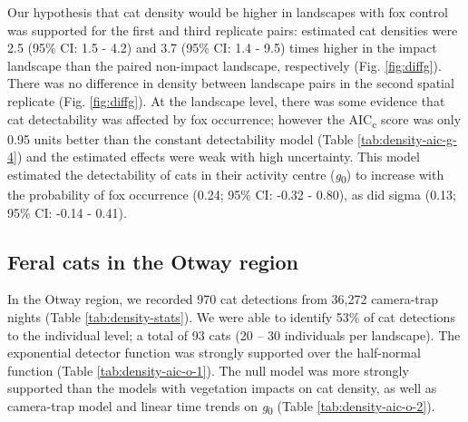 \documentclass[11pt,a4paper,titlepage,twoside,openright]{style/unimelbthesis}
\begin{document}
\begin{mainmatter}
Our hypothesis that cat density would be higher in landscapes with fox control was supported for the first and third replicate pairs: estimated cat densities were 2.5 (95\% CI: 1.5 - 4.2) and 3.7 (95\% CI: 1.4 - 9.5) times higher in the impact landscape than the paired non-impact landscape, respectively (Fig. \ref{fig:diffg}). There was no difference in density between landscape pairs in the second spatial replicate (Fig. \ref{fig:diffg}). At the landscape level, there was some evidence that cat detectability was affected by fox occurrence; however the AIC\textsubscript{c} score was only 0.95 units better than the constant detectability model (Table \ref{tab:density-aic-g-4}) and the estimated effects were weak with high uncertainty. This model estimated the detectability of cats in their activity centre (\emph{g}\textsubscript{0}) to increase with the probability of fox occurrence (0.24; 95\% CI: -0.32 - 0.80), as did sigma (0.13; 95\% CI: -0.14 - 0.41).

\hypertarget{feral-cats-in-the-otway-region}{%
\subsection{Feral cats in the Otway region}\label{feral-cats-in-the-otway-region}}

In the Otway region, we recorded 970 cat detections from 36,272 camera-trap nights (Table \ref{tab:density-stats}). We were able to identify 53\% of cat detections to the individual level; a total of 93 cats (20 -- 30 individuals per landscape). The exponential detector function was strongly supported over the half-normal function (Table \ref{tab:density-aic-o-1}). The null model was more strongly supported than the models with vegetation impacts on cat density, as well as camera-trap model and linear time trends on \emph{g}\textsubscript{0} (Table \ref{tab:density-aic-o-2}).


\end{mainmatter}
\end{document}
